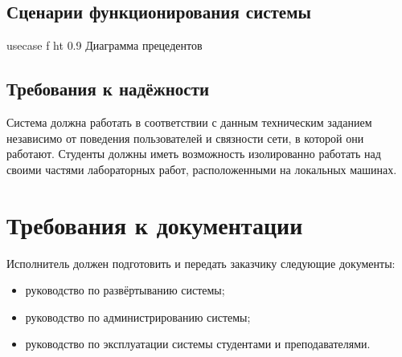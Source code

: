 \documentclass{bmstu}
\begin{document}
  \subsection{Сценарии функционирования системы}

    {usecase}
    {f}
    {ht}
    {0.9 \textwidth}
    {Диаграмма прецедентов}

  \subsection{Требования к надёжности}

  Система должна работать в соответствии с данным техническим заданием
  независимо от поведения пользователей и связности сети, в которой
  они работают.
  Студенты должны иметь возможность изолированно работать над своими
  частями лабораторных работ, расположенными на локальных машинах.

  \section{Требования к документации}

  Исполнитель должен подготовить и передать заказчику следующие
  документы:
  \begin{itemize}[label=---]
    \item руководство по развёртыванию системы;
    \item руководство по администрированию системы;
    \item руководство по эксплуатации системы студентами и
      преподавателями.
  \end{itemize}
\end{document}
